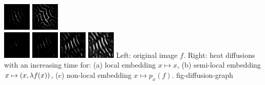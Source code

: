 \documentclass[final]{siamltex}
\begin{document}
{\includegraphics[width=0.18\linewidth]{diffusion/corral/corral-diffusion-neigh-5.png}
\includegraphics[width=0.18\linewidth]{diffusion/corral/corral-diffusion-neigh-6.png}\\\vspace{1mm}
\hspace{0.18\linewidth}
\hspace{1mm}
\includegraphics[width=0.18\linewidth]{diffusion/corral/corral-diffusion-un-normalized-3.png}
\includegraphics[width=0.18\linewidth]{diffusion/corral/corral-diffusion-un-normalized-4.png}
\includegraphics[width=0.18\linewidth]{diffusion/corral/corral-diffusion-un-normalized-5.png}
\includegraphics[width=0.18\linewidth]{diffusion/corral/corral-diffusion-un-normalized-6.png}
}{
Left: original image $f$.
Right: heat diffusions with an increasing time for: (a) local embedding $x \mapsto x$, (b) semi-local embedding $x \mapsto (x,\lambda f(x))$, (c) non-local embedding $x \mapsto p_x(f)$.
%
}{fig-diffusion-graph}
\end{document}
